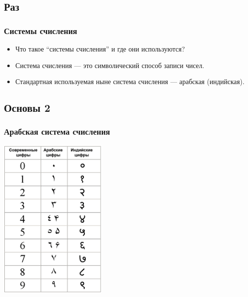 \documentclass[compress,red]{beamer}
\begin{document}
\subsection{Раз}
\begin{frame}
  \frametitle{Системы счисления}
  \begin{itemize}
    \item Что такое ``системы счисления'' и где они используются?
    \item Система счисления --- это символический способ записи чисел.
    \item Стандартная используемая ныне система счисления --- арабская (индийская).
  \end{itemize}
\end{frame}

\subsection{Основы 2}
\begin{frame}[fragile]
  \frametitle{Арабская система счисления}
  \centerline{\includegraphics[width=0.4\textwidth]{images/arabian_numbers.png}}
\end{frame}
\end{document}
